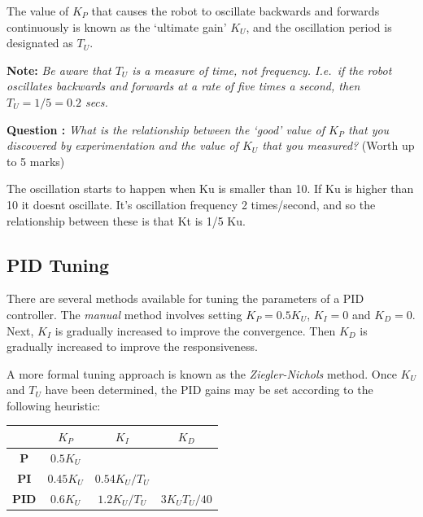 \documentclass[hidelinks,a4paper,11pt]{article}
\newcounter{question}
\newcommand\myq{\refstepcounter{question}\thequestion}
\begin{document}
The value of $K_P$ that causes the robot to oscillate backwards and forwards continuously is known as the `ultimate gain' $K_U$, and the oscillation period is designated as $T_U$.

{\bfseries Note:}  \emph{Be aware that $T_U$ is a measure of time, not frequency.  I.e.\ if the robot oscillates backwards and forwards at a rate of five times a second, then $T_U=1/5=0.2$ secs.}

{\bfseries Question \myq:}  \emph{What is the relationship between the `good' value of $K_P$ that you discovered by experimentation and the value of $K_U$ that you measured?} (Worth up to 5 marks)\\
\begin{mdframed}

The oscillation starts to happen when Ku is smaller than 10. If Ku is higher than 10 it doesnt oscillate.
It's oscillation frequency 2 times/second, and so the relationship between these is that Kt is 1/5 Ku.
\end{mdframed}
\vspace*{\baselineskip}


\subsection {PID Tuning}

There are several methods available for tuning the parameters of a PID controller.  The \emph{manual} method involves setting $K_P=0.5K_U$, $K_I=0$ and $K_D=0$.  Next, $K_I$ is gradually increased to improve the convergence.  Then $K_D$ is gradually increased to improve the responsiveness.

A more formal tuning approach is known as the \emph{Ziegler-Nichols} method.  Once $K_U$ and $T_U$ have been determined, the PID gains may be set according to the following heuristic:
\begin{center}
	\begin{tabular}{ | c | c | c | c | } \hline
		 & \bf{$K_P$} & \bf{$K_I$} & \bf{$K_D$} \\ \hline
		\bf{P} & $0.5K_U$ &  &  \\ \hline
		\bf{PI} & $0.45K_U$ & $0.54K_U/T_U$ &  \\ \hline
		\bf{PID} & $0.6K_U$ & $1.2K_U/T_U$ & $3K_UT_U/40$ \\ \hline
	\end{tabular}
\end{center}
\vspace*{\baselineskip}
\end{document}
